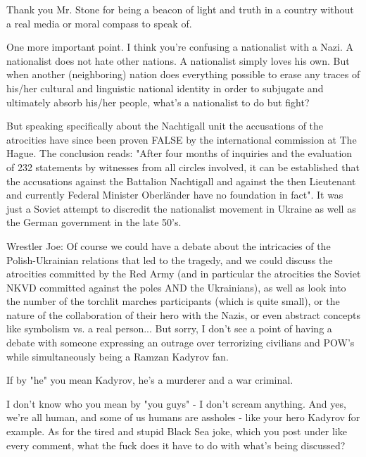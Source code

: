 \begin{itemize}

Thank you Mr. Stone for being a beacon of light and truth in a country without
a real media or moral compass to speak of.


One more important point. I think you're confusing a nationalist with a Nazi. A
nationalist does not hate other nations. A nationalist simply loves his own.
But when another (neighboring) nation does everything possible to erase any
traces of his/her cultural and linguistic national identity in order to
subjugate and ultimately absorb his/her people, what's a nationalist to do but
fight?

But speaking specifically about the Nachtigall unit the accusations of the
atrocities have since been proven FALSE by the international commission at The
Hague. The conclusion reads: "After four months of inquiries and the evaluation
of 232 statements by witnesses from all circles involved, it can be established
that the accusations against the Battalion Nachtigall and against the then
Lieutenant and currently Federal Minister Oberländer have no foundation in
fact". It was just a Soviet attempt to discredit the nationalist movement in
Ukraine as well as the German government in the late 50's.

\begin{itemize} %

Wrestler Joe: Of course we could have a debate about the intricacies of the
Polish-Ukrainian relations that led to the tragedy, and we could discuss the
atrocities committed by the Red Army (and in particular the atrocities the
Soviet NKVD committed against the poles AND the Ukrainians), as well as look
into the number of the torchlit marches participants (which is quite small), or
the nature of the collaboration of their hero with the Nazis, or even abstract
concepts like symbolism vs. a real person... But sorry, I don't see a point of
having a debate with someone expressing an outrage over terrorizing civilians
and POW's while simultaneously being a Ramzan Kadyrov fan.


If by "he" you mean Kadyrov, he's a murderer and a war criminal.


I don't know who you mean by "you guys" - I don't scream anything. And yes,
we're all human, and some of us humans are assholes - like your hero Kadyrov
for example. As for the tired and stupid Black Sea joke, which you post under
like every comment, what the fuck does it have to do with what's being
discussed?

\end{itemize} %

\end{itemize} %
